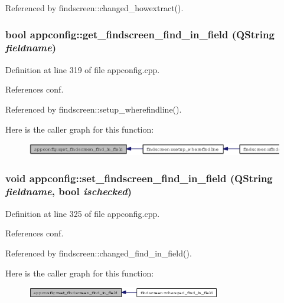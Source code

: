 Referenced by findscreen::changed\_\-howextract().
\subsubsection{\setlength{\rightskip}{0pt plus 5cm}bool appconfig::get\_\-findscreen\_\-find\_\-in\_\-field (QString {\em fieldname})}\label{classappconfig_87e86c00befff9437750da73f9ef0880}




Definition at line 319 of file appconfig.cpp.

References conf.

Referenced by findscreen::setup\_\-wherefindline().

Here is the caller graph for this function:\begin{figure}[H]
\begin{center}
\leavevmode
\includegraphics[width=320pt]{classappconfig_87e86c00befff9437750da73f9ef0880_icgraph}
\end{center}
\end{figure}
\subsubsection{\setlength{\rightskip}{0pt plus 5cm}void appconfig::set\_\-findscreen\_\-find\_\-in\_\-field (QString {\em fieldname}, bool {\em ischecked})}\label{classappconfig_5f7bdbefcb85033c9e0a92a02df38010}




Definition at line 325 of file appconfig.cpp.

References conf.

Referenced by findscreen::changed\_\-find\_\-in\_\-field().

Here is the caller graph for this function:\begin{figure}[H]
\begin{center}
\leavevmode
\includegraphics[width=240pt]{classappconfig_5f7bdbefcb85033c9e0a92a02df38010_icgraph}
\end{center}
\end{figure}
